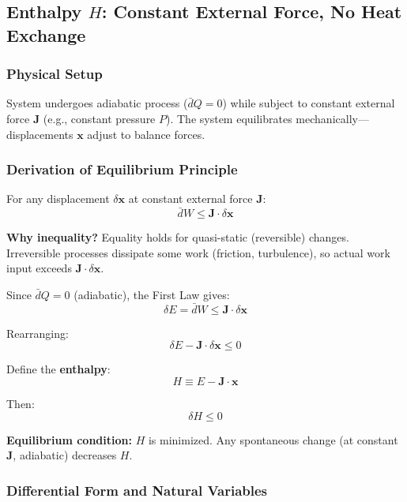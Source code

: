\documentclass[9pt,twocoloumn]{article}
\begin{document}
\subsection{Enthalpy $H$: Constant External Force, No Heat Exchange}

\subsubsection{Physical Setup}
System undergoes adiabatic process ($\bar{d}Q = 0$) while subject to constant external force $\mathbf{J}$ (e.g., constant pressure $P$). The system equilibrates mechanically—displacements $\mathbf{x}$ adjust to balance forces.

\subsubsection{Derivation of Equilibrium Principle}

For any displacement $\delta \mathbf{x}$ at constant external force $\mathbf{J}$:
\begin{equation}
\bar{d}W \leq \mathbf{J} \cdot \delta \mathbf{x}
\end{equation}

\textbf{Why inequality?} Equality holds for quasi-static (reversible) changes. Irreversible processes dissipate some work (friction, turbulence), so actual work input exceeds $\mathbf{J} \cdot \delta \mathbf{x}$.

Since $\bar{d}Q = 0$ (adiabatic), the First Law gives:
\begin{equation}
\delta E = \bar{d}W \leq \mathbf{J} \cdot \delta \mathbf{x}
\end{equation}

Rearranging:
\begin{equation}
\delta E - \mathbf{J} \cdot \delta \mathbf{x} \leq 0
\end{equation}

Define the \textbf{enthalpy}:
\begin{equation}
\boxed{H \equiv E - \mathbf{J} \cdot \mathbf{x}}
\end{equation}

Then:
\begin{equation}
\boxed{\delta H \leq 0}
\end{equation}

\textbf{Equilibrium condition:} $H$ is minimized. Any spontaneous change (at constant $\mathbf{J}$, adiabatic) decreases $H$.

\subsubsection{Differential Form and Natural Variables}
\end{document}
